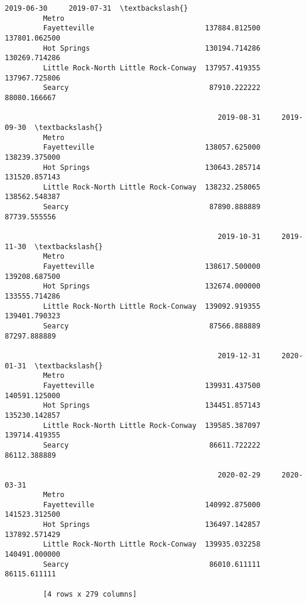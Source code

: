 \documentclass[11pt]{article}
\begin{document}
\begin{Verbatim}[commandchars=\\\{\}]
                                                  2019-06-30     2019-07-31  \textbackslash{}
         Metro                                                                
         Fayetteville                          137884.812500  137801.062500   
         Hot Springs                           130194.714286  130269.714286   
         Little Rock-North Little Rock-Conway  137957.419355  137967.725806   
         Searcy                                 87910.222222   88080.166667   
         
                                                  2019-08-31     2019-09-30  \textbackslash{}
         Metro                                                                
         Fayetteville                          138057.625000  138239.375000   
         Hot Springs                           130643.285714  131520.857143   
         Little Rock-North Little Rock-Conway  138232.258065  138562.548387   
         Searcy                                 87890.888889   87739.555556   
         
                                                  2019-10-31     2019-11-30  \textbackslash{}
         Metro                                                                
         Fayetteville                          138617.500000  139208.687500   
         Hot Springs                           132674.000000  133555.714286   
         Little Rock-North Little Rock-Conway  139092.919355  139401.790323   
         Searcy                                 87566.888889   87297.888889   
         
                                                  2019-12-31     2020-01-31  \textbackslash{}
         Metro                                                                
         Fayetteville                          139931.437500  140591.125000   
         Hot Springs                           134451.857143  135230.142857   
         Little Rock-North Little Rock-Conway  139585.387097  139714.419355   
         Searcy                                 86611.722222   86112.388889   
         
                                                  2020-02-29     2020-03-31  
         Metro                                                               
         Fayetteville                          140992.875000  141523.312500  
         Hot Springs                           136497.142857  137892.571429  
         Little Rock-North Little Rock-Conway  139935.032258  140491.000000  
         Searcy                                 86010.611111   86115.611111  
         
         [4 rows x 279 columns]
\end{Verbatim}
            
\end{document}
